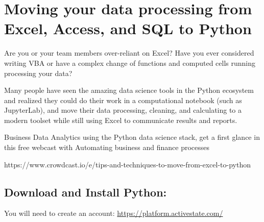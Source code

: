 \section * {Moving your data processing from Excel, Access, and SQL to Python}

Are you or your team members over-reliant on Excel? Have you ever considered writing VBA or have a complex change of functions and computed cells running processing your data?

Many people have seen the amazing data science tools in the Python ecosystem and realized they could do their work in a computational notebook (such as JupyterLab), and move their data processing, cleaning, and calculating to a modern toolset while still using Excel to communicate results and reports.

Business Data Analytics using the Python data science stack, get a first glance in this free webcast with Automating business and finance processes

https://www.crowdcast.io/e/tips-and-techniques-to-move-from-excel-to-python


\subsection{Download and Install Python:}
You will need to create an account:
\url{https://platform.activestate.com/}